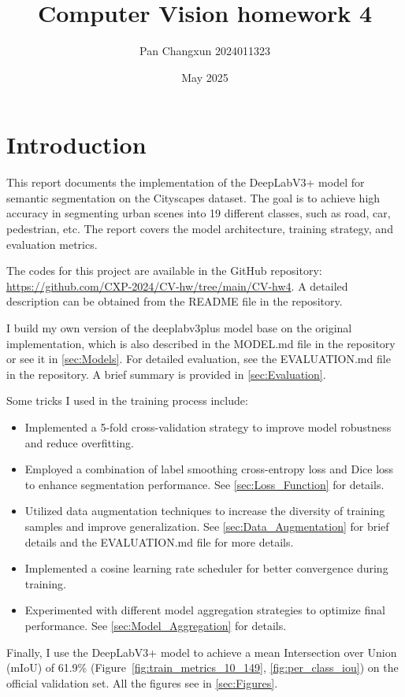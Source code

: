 \documentclass[]{article}
\title{\textbf{Computer Vision homework 4}}
\author{Pan Changxun 2024011323}
\date{May 2025}
\begin{document}
\maketitle

\section{Introduction}
This report documents the implementation of the DeepLabV3+ model for semantic segmentation on the Cityscapes dataset. The goal is to achieve high accuracy in segmenting urban scenes into 19 different classes, such as road, car, pedestrian, etc. The report covers the model architecture, training strategy, and evaluation metrics.

The codes for this project are available in the GitHub repository: \url{https://github.com/CXP-2024/CV-hw/tree/main/CV-hw4}.
A detailed description can be obtained from the README file in the repository. 

I build my own version of the deeplabv3plus model base on the original implementation, which is also described in the MODEL.md file in the repository or see it in \ref{sec:Models}. For detailed evaluation, see the EVALUATION.md file in the repository. A brief summary is provided in \ref{sec:Evaluation}.

Some tricks I used in the training process include:
\begin{itemize}
		\item Implemented a 5-fold cross-validation strategy to improve model robustness and reduce overfitting.
		\item Employed a combination of label smoothing cross-entropy loss and Dice loss to enhance segmentation performance. See \ref{sec:Loss_Function} for details.
		\item Utilized data augmentation techniques to increase the diversity of training samples and improve generalization. See \ref{sec:Data_Augmentation} for brief details and the EVALUATION.md file for more details.
		\item Implemented a cosine learning rate scheduler for better convergence during training. 
		\item Experimented with different model aggregation strategies to optimize final performance. See \ref{sec:Model_Aggregation} for details.
\end{itemize}

Finally, I use the DeepLabV3+ model to achieve a mean Intersection over Union (mIoU) of 61.9\% (Figure~\ref{fig:train_metrics_10_149}, \ref{fig:per_class_iou}) on the official validation set. All the figures see in \ref{sec:Figures}.
\end{document}

